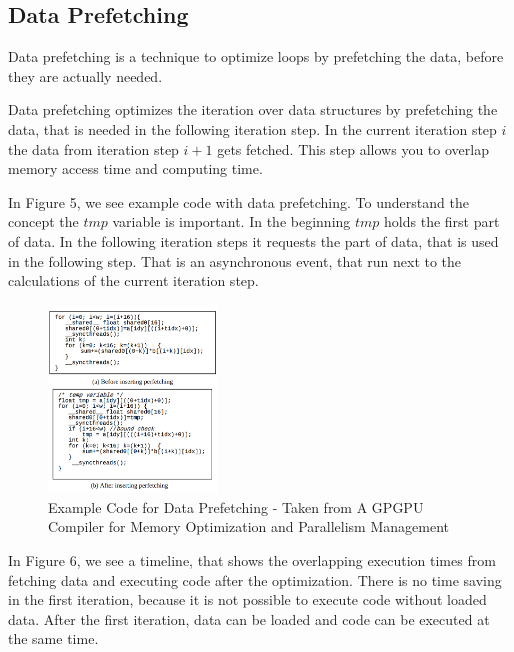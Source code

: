 \documentclass[conference]{IEEEtran}
\begin{document}
	\subsection{Data Prefetching}
		
		
		Data prefetching is a technique to optimize loops by prefetching the data, before they are actually needed.
		
		
		Data prefetching optimizes the iteration over data structures by prefetching the data, that is needed in the following iteration step. In the current iteration step $i$ the data from iteration step $i+1$ gets fetched. This step allows you to overlap memory access time and computing time.
		
		In Figure 5, we see example code with data prefetching. To understand the concept the $tmp$ variable is important. In the beginning $tmp$ holds the first part of data. In the following iteration steps it requests the part of data, that is used in the following step. That is an asynchronous event, that run next to the calculations of the current iteration step. 
		
		\begin{figure}[htbp]
			\centerline{\includegraphics[width=0.4\textwidth]{DataPrefetchingCodeExample.png}}
			\caption{Example Code for Data Prefetching - Taken from  A GPGPU Compiler for Memory Optimization and Parallelism Management}
			\label{fig2}
		\end{figure}
	
		In Figure 6, we see a timeline, that shows the overlapping execution times from fetching data and executing code after the optimization. There is no time saving in the first iteration, because it is not possible to execute code without loaded data. After the first iteration, data can be loaded and code can be executed at the same time.
		
\end{document}
